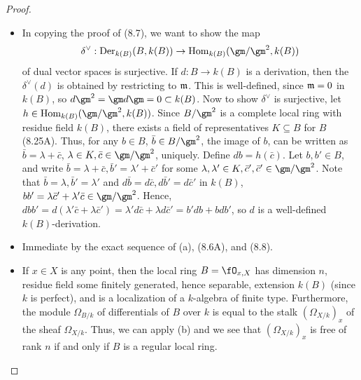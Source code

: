 \documentclass[a4paper]{article}
\begin{document}
\begin{enumerate} [label=\textbf{\arabic*.}, leftmargin=0em]
          \begin{proof} $ $ \vspace{0pt}
              \begin{itemize} [leftmargin=0cm]
                  \item[(a)] In copying the proof of (8.7), we want to show the map
                        \begin{equation*}
                            \delta^\vee : \Der_{k(B)}(B, k(B)) \to \Hom_{k(B)}(\gm/\gm^2, k(B))
                        \end{equation*}
                        of dual vector spaces is surjective.
                        If $d : B \to k(B)$ is a derivation, then the $\delta^\vee(d)$ is obtained by restricting to $\mathfrak{m}$.
                        This is well-defined, since $\mathfrak{m} = 0$ in $k(B)$, so $d\gm^2 = \gm d\gm = 0 \subset k(B)$.
                        Now to show $\delta^\vee$ is surjective, let $h \in \Hom_{k(B)}(\gm/\gm^2, k(B))$. Since $B / \gm^2$ is a complete local ring with residue field $k(B)$, there exists a field of representatives $K \subseteq B$ for $B$ (8.25A).
                        Thus, for any $b \in B$, $\bar{b} \in B / \gm^2$, the image of $b$, can be written as $\bar{b} = \lambda + \bar{c}$, $\lambda \in K, \bar{c} \in \gm/\gm^2$, uniquely.
                        Define $db = h(\bar{c})$.
                        Let $b, b' \in B$, and write $\bar{b} = \lambda + \bar{c}, \bar{b}' = \lambda' + \bar{c}'$ for some $\lambda, \lambda' \in K, \bar{c}', \bar{c}' \in \gm/\gm^2$.
                        Note that $\bar{b} = \lambda, \bar{b}' = \lambda'$ and $d\bar{b} = d\bar{c}, d\bar{b}' = d\bar{c}'$ in $k(B)$, $bb' = \lambda \bar{c}' + \lambda' \bar{c} \in \gm/\gm^2$.
                        Hence, $dbb' = d(\lambda' \bar{c} + \lambda \bar{c}') = \lambda' d\bar{c} + \lambda d\bar{c}' = b'db + bdb'$, so $d$ is a well-defined $k(B)$-derivation.

                  \item[(b)] Immediate by the exact sequence of (a), (8.6A), and (8.8).

                  \item[(c)] If $x \in X$ is any point, then the local ring $B = \fO_{x, X}$ has dimension $n$, residue field some finitely generated, hence separable, extension $k(B)$ (since $k$ is perfect), and is a localization of a $k$-algebra of finite type.
                        Furthermore, the module $\Omega_{B/k}$ of differentials of $B$ over $k$ is equal to the stalk $(\Omega_{X/k})_x$ of the sheaf $\Omega_{X/k}$.
                        Thus, we can apply (b) and we see that $(\Omega_{X/k})_x$ is free of rank $n$ if and only if $B$ is a regular local ring.


\end{itemize}
\end{proof}
\end{enumerate}
\end{document}
